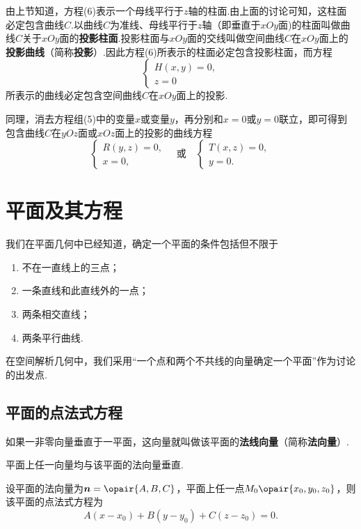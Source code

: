 由上节知道，方程(6)表示一个母线平行于\(z\)轴的柱面.由上面的讨论可知，这柱面必定包含曲线\(C\).以曲线\(C\)为准线、母线平行于\(z\)轴（即垂直于\(xOy\)面)的柱面叫做曲线\(C\)关于\(xOy\)面的\textbf{投影柱面}.投影柱面与\(xOy\)面的交线叫做空间曲线\(C\)在\(xOy\)面上的\textbf{投影曲线}（简称\textbf{投影}）.因此方程(6)所表示的柱面必定包含投影柱面，而方程\[
\left\{ \begin{array}{l}
H(x,y)=0, \\
z=0
\end{array} \right.
\]所表示的曲线必定包含空间曲线\(C\)在\(xOy\)面上的投影.

同理，消去方程组(5)中的变量\(x\)或变量\(y\)，再分别和\(x=0\)或\(y=0\)联立，即可得到包含曲线\(C\)在\(yOz\)面或\(xOz\)面上的投影的曲线方程\[
\left\{ \begin{array}{l}
R(y,z)=0, \\
x=0,
\end{array} \right.
\quad \text{或} \quad
\left\{ \begin{array}{l}
T(x,z)=0, \\
y=0.
\end{array} \right.
\]

\section{平面及其方程}
我们在平面几何中已经知道，确定一个平面的条件包括但不限于\begin{enumerate}
\item 不在一直线上的三点；
\item 一条直线和此直线外的一点；
\item 两条相交直线；
\item 两条平行曲线.
\end{enumerate}在空间解析几何中，我们采用“一个点和两个不共线的向量确定一个平面”作为讨论的出发点.

\subsection{平面的点法式方程}
\begin{definition}
如果一非零向量垂直于一平面，这向量就叫做该平面的\textbf{法线向量}（简称\textbf{法向量}）.
\end{definition}

\begin{property}
平面上任一向量均与该平面的法向量垂直.
\end{property}

设平面的法向量为\(\mat{n}=\opair{A,B,C}\)，平面上任一点\(M_0\opair{x_0,y_0,z_0}\)，则该平面的点法式方程为\[
A(x-x_0)+B(y-y_0)+C(z-z_0)=0.
\]

